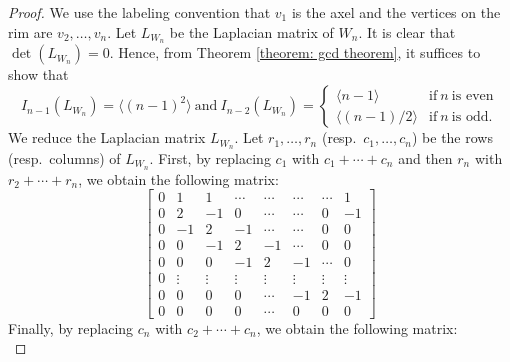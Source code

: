 \documentclass[11pt,reqno]{amsart}
\theoremstyle{definition}
\theoremstyle{plain}
\begin{document}
\begin{proof}
We use the labeling convention that $v_1$ is the axel and the vertices on the rim are $v_2, \dots, v_{n}$.  
Let $L_{W_n}$ be the Laplacian matrix of $W_n$. It is clear that $\det(L_{W_n})=0$. Hence, from Theorem \ref{theorem: gcd theorem}, it suffices to show that 
\begin{equation*}
I_{n-1}(L_{W_n}) = \langle (n-1)^2 \rangle~\text{and}~ I_{n-2}(L_{W_n}) = \begin{cases}
\langle n-1 \rangle & \text{if}~ n ~\text{is even} \\
\langle (n-1)/2\rangle & \text{if}~ n ~\text{is odd}.
\end{cases}
\end{equation*}
We reduce the Laplacian matrix $L_{W_n}$. Let $r_1,\dots,r_n$ (resp.~$c_1,\dots,c_n$) be the rows (resp.~columns) of $L_{W_n}$. First, by replacing $c_1$ with $c_1+\cdots+c_n$ and then $r_n$ with $r_2+\cdots +r_n$, we obtain the following matrix:
\begin{equation}
\left[	\begin{array}{c|ccccccc}
		0 & 1 & 1 & \cdots & \cdots & \cdots & \cdots & 1 \\
	\hline
	0  & 2 & -1 & 0 & \cdots & \cdots & 0 & -1 \\
	0  & - 1& 2 & -1 & \cdots & \cdots & 0 & 0 \\
	0  & 0 & - 1& 2 & -1 & \cdots & 0 & 0 \\
	0 & 0 & 0 & - 1& 2 & -1 & \cdots & 0 \\
	0  & \vdots & \vdots &\vdots & \vdots& \vdots& \vdots& \vdots\\
	0  & 0 & 0 & 0 & \cdots & -1& 2 & -1 \\
	0  & 0 & 0 & 0 & \cdots& 0 & 0 & 0
	\end{array} \right]
\end{equation}
Finally, by replacing $c_n$ with $c_2+\cdots+c_n$, we obtain the following matrix:
\begin{equation}

\end{equation}
\end{proof}
\end{document}
